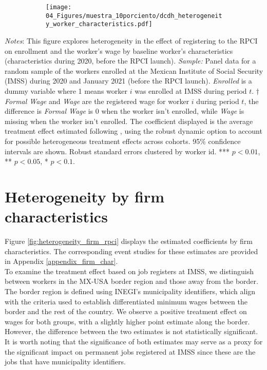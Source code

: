 \documentclass[10pt, oneside]{book}
\begin{document}
\begin{figure}[H]
    \centering
    \caption{Heterogeneity by worker characteristics \label{fig:heterogeneity_worker_rpci}}
    
    \begin{subfigure}{\textwidth}
    \texttt{[image: 04\_Figures/muestra\_10porciento/dcdh\_heterogeneity\_worker\_characteristics.pdf]}
    \end{subfigure}
    
\end{figure}

\scriptsize{
\noindent \textit{Notes}: This figure explores heterogeneity in the effect of registering to the RPCI on enrollment and the worker's wage by baseline worker's characteristics (characteristics during 2020, before the RPCI launch). \textit{Sample:} Panel data for a random sample of the workers enrolled at the Mexican Institute of Social Security (IMSS) during 2020 and January 2021 (before the RPCI launch). \textit{Enrolled} is a dummy variable where 1 means worker $i$ was enrolled at IMSS during period $t$. $\dagger$ \textit{Formal Wage} and \textit{Wage} are the registered wage for worker $i$ during period $t$, the difference is \textit{Formal Wage} is 0 when the worker isn't enrolled, while \textit{Wage} is missing when the worker isn't enrolled. The coefficient displayed is the average treatment effect estimated following \cite{de2020two}, using the robust dynamic option to account for possible heterogeneous treatment effects across cohorts. 95\% confidence intervals are shown. Robust standard errors clustered by worker id. *** $p<0.01$, ** $p<0.05$, * $p<0.1$. %
} \\

\normalsize

\section{Heterogeneity by firm characteristics}

Figure \ref{fig:heterogeneity_firm_rpci} displays the estimated coefficients by firm characteristics. The corresponding event studies for these estimates are provided in Appendix \ref{appendix_firm_char}. \\

To examine the treatment effect based on job registers at IMSS, we distinguish between workers in the MX-USA border region and those away from the border. The border region is defined using INEGI's municipality identifiers, which align with the criteria used to establish differentiated minimum wages between the border and the rest of the country. We observe a positive treatment effect on wages for both groups, with a slightly higher point estimate along the border. However, the difference between the two estimates is not statistically significant. It is worth noting that the significance of both estimates may serve as a proxy for the significant impact on permanent jobs registered at IMSS since these are the jobs that have municipality identifiers. \\
\end{document}
